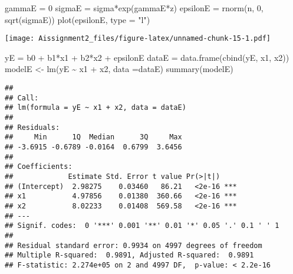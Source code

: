 \documentclass[
]{article}
\newenvironment{Shaded}{\begin{snugshade}}{\end{snugshade}}
\newcommand{\AttributeTok}[1]{\textcolor[rgb]{0.77,0.63,0.00}{#1}}
\newcommand{\CommentTok}[1]{\textcolor[rgb]{0.56,0.35,0.01}{\textit{#1}}}
\newcommand{\DecValTok}[1]{\textcolor[rgb]{0.00,0.00,0.81}{#1}}
\newcommand{\FunctionTok}[1]{\textcolor[rgb]{0.00,0.00,0.00}{#1}}
\newcommand{\NormalTok}[1]{#1}
\newcommand{\OtherTok}[1]{\textcolor[rgb]{0.56,0.35,0.01}{#1}}
\newcommand{\SpecialCharTok}[1]{\textcolor[rgb]{0.00,0.00,0.00}{#1}}
\newcommand{\StringTok}[1]{\textcolor[rgb]{0.31,0.60,0.02}{#1}}
\begin{document}
\begin{Shaded}
\begin{Highlighting}[]
\NormalTok{gammaE }\OtherTok{=} \DecValTok{0}
\NormalTok{sigmaE }\OtherTok{=}\NormalTok{ sigma}\SpecialCharTok{*}\FunctionTok{exp}\NormalTok{(gammaE}\SpecialCharTok{*}\NormalTok{z)}
\NormalTok{epsilonE }\OtherTok{=} \FunctionTok{rnorm}\NormalTok{(n, }\DecValTok{0}\NormalTok{, }\FunctionTok{sqrt}\NormalTok{(sigmaE))}
\FunctionTok{plot}\NormalTok{(epsilonE, }\AttributeTok{type =} \StringTok{"l"}\NormalTok{)}
\end{Highlighting}
\end{Shaded}

\texttt{[image: Aissignment2\_files/figure-latex/unnamed-chunk-15-1.pdf]}

\begin{Shaded}
\begin{Highlighting}[]
\NormalTok{yE }\OtherTok{=}\NormalTok{ b0 }\SpecialCharTok{+}\NormalTok{ b1}\SpecialCharTok{*}\NormalTok{x1 }\SpecialCharTok{+}\NormalTok{ b2}\SpecialCharTok{*}\NormalTok{x2 }\SpecialCharTok{+}\NormalTok{ epsilonE}
\NormalTok{dataE }\OtherTok{=} \FunctionTok{data.frame}\NormalTok{(}\FunctionTok{cbind}\NormalTok{(yE, x1, x2))}
\NormalTok{modelE }\OtherTok{\textless{}{-}} \FunctionTok{lm}\NormalTok{(yE }\SpecialCharTok{\textasciitilde{}}\NormalTok{ x1 }\SpecialCharTok{+}\NormalTok{ x2, }\AttributeTok{data =}\NormalTok{dataE)}
\FunctionTok{summary}\NormalTok{(modelE)}
\end{Highlighting}
\end{Shaded}

\begin{verbatim}
## 
## Call:
## lm(formula = yE ~ x1 + x2, data = dataE)
## 
## Residuals:
##     Min      1Q  Median      3Q     Max 
## -3.6915 -0.6789 -0.0164  0.6799  3.6456 
## 
## Coefficients:
##             Estimate Std. Error t value Pr(>|t|)    
## (Intercept)  2.98275    0.03460   86.21   <2e-16 ***
## x1           4.97856    0.01380  360.66   <2e-16 ***
## x2           8.02233    0.01408  569.58   <2e-16 ***
## ---
## Signif. codes:  0 '***' 0.001 '**' 0.01 '*' 0.05 '.' 0.1 ' ' 1
## 
## Residual standard error: 0.9934 on 4997 degrees of freedom
## Multiple R-squared:  0.9891, Adjusted R-squared:  0.9891 
## F-statistic: 2.274e+05 on 2 and 4997 DF,  p-value: < 2.2e-16
\end{verbatim}

\begin{Shaded}
\end{Shaded}
\end{document}
